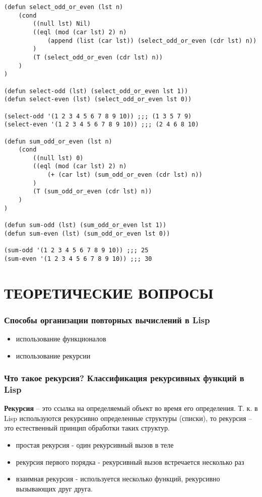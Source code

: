 \begin{lstlisting}
(defun select_odd_or_even (lst n)
    (cond
        ((null lst) Nil)
        ((eql (mod (car lst) 2) n)
            (append (list (car lst)) (select_odd_or_even (cdr lst) n))
        )
        (T (select_odd_or_even (cdr lst) n))
    )
)

(defun select-odd (lst) (select_odd_or_even lst 1))
(defun select-even (lst) (select_odd_or_even lst 0))

(select-odd '(1 2 3 4 5 6 7 8 9 10)) ;;; (1 3 5 7 9)
(select-even '(1 2 3 4 5 6 7 8 9 10)) ;;; (2 4 6 8 10)

(defun sum_odd_or_even (lst n)
    (cond
        ((null lst) 0)
        ((eql (mod (car lst) 2) n)
            (+ (car lst) (sum_odd_or_even (cdr lst) n))
        )
        (T (sum_odd_or_even (cdr lst) n))
    )
)

(defun sum-odd (lst) (sum_odd_or_even lst 1))
(defun sum-even (lst) (sum_odd_or_even lst 0))

(sum-odd '(1 2 3 4 5 6 7 8 9 10)) ;;; 25
(sum-even '(1 2 3 4 5 6 7 8 9 10)) ;;; 30
\end{lstlisting}

\section{ТЕОРЕТИЧЕСКИЕ ВОПРОСЫ}

\subsubsection{Способы организации повторных вычислений в Lisp}

\begin{itemize}
    \item использование функционалов
    \item использование рекурсии
\end{itemize}

\subsubsection{Что такое рекурсия?
Классификация рекурсивных функций в Lisp}

\textbf{Рекурсия} -- это ссылка на определяемый объект во
время его определения.
Т. к. в Lisp используются рекурсивно определенные структуры (списки),
то рекурсия -- это естественный принцип обработки таких структур.

\begin{itemize}
    \item простая рекурсия - один рекурсивный вызов в теле
    \item рекурсия первого порядка - рекурсивный вызов встречается несколько раз
    \item взаимная рекурсия - используется несколько функций,
        рекурсивно вызывающих друг друга.
\end{itemize}

